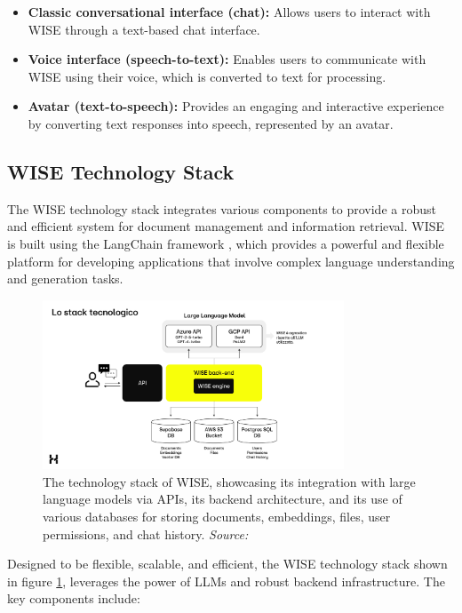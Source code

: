 \begin{itemize}
    \item \textbf{Classic conversational interface (chat):} Allows users to interact with WISE through a text-based chat interface.
    \item \textbf{Voice interface (speech-to-text):} Enables users to communicate with WISE using their voice, which is converted to text for processing.
    \item \textbf{Avatar (text-to-speech):} Provides an engaging and interactive experience by converting text responses into speech, represented by an avatar.
\end{itemize}

\subsection{WISE Technology Stack}

The WISE technology stack integrates various components to provide a robust and efficient system for document management and information retrieval. WISE is built using the LangChain framework \cite{langchain2024}, which provides a powerful and flexible platform for developing applications that involve complex language understanding and generation tasks.

\begin{figure}[h!]
    \centering
    \includegraphics[width=0.8\textwidth]{images/wise/wise-stack.png}
    \caption{The technology stack of WISE, showcasing its integration with large language models via APIs, its backend architecture, and its use of various databases for storing documents, embeddings, files, user permissions, and chat history. \textit{Source:} \cite{hpa2024}}
    \label{fig:wise-stack}
\end{figure}

Designed to be flexible, scalable, and efficient, the WISE technology stack shown in figure \ref{fig:wise-stack}, leverages the power of LLMs and robust backend infrastructure. The key components include:

